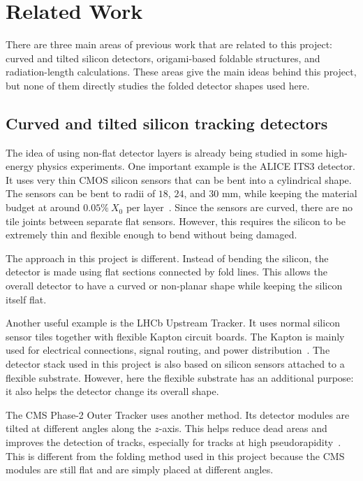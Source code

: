 \documentclass[a4paper,11pt]{article}
\begin{document}
\section{Related Work}
\label{sec:related}

There are three main areas of previous work that are related to this project: curved and tilted silicon detectors, origami-based foldable structures, and radiation-length calculations. These areas give the main ideas behind this project, but none of them directly studies the folded detector shapes used here.

\subsection{Curved and tilted silicon tracking detectors}

The idea of using non-flat detector layers is already being studied in some high-energy physics experiments. One important example is the ALICE ITS3 detector. It uses very thin CMOS silicon sensors that can be bent into a cylindrical shape. The sensors can be bent to radii of $18$, $24$, and $30\text{ mm}$, while keeping the material budget at around $0.05\%\ X_0$ per layer~\cite{ALICE2024, Sonneveld2023}. Since the sensors are curved, there are no tile joints between separate flat sensors. However, this requires the silicon to be extremely thin and flexible enough to bend without being damaged.

The approach in this project is different. Instead of bending the silicon, the detector is made using flat sections connected by fold lines. This allows the overall detector to have a curved or non-planar shape while keeping the silicon itself flat.

Another useful example is the LHCb Upstream Tracker. It uses normal silicon sensor tiles together with flexible Kapton circuit boards. The Kapton is mainly used for electrical connections, signal routing, and power distribution~\cite{Lionetto2014}. The detector stack used in this project is also based on silicon sensors attached to a flexible substrate. However, here the flexible substrate has an additional purpose: it also helps the detector change its overall shape.

The CMS Phase-2 Outer Tracker uses another method. Its detector modules are tilted at different angles along the $z$-axis. This helps reduce dead areas and improves the detection of tracks, especially for tracks at high pseudorapidity~\cite{CMS2017}. This is different from the folding method used in this project because the CMS modules are still flat and are simply placed at different angles.
\end{document}
